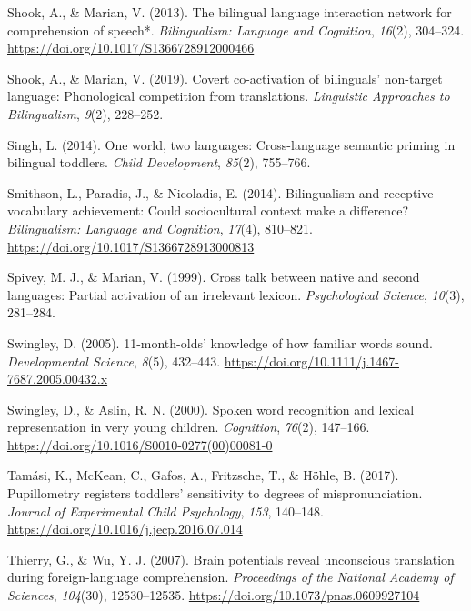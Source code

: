 \documentclass[
]{article}
\newlength{\cslhangindent}
\newlength{\cslentryspacingunit} %
\newenvironment{CSLReferences}[2] %
 {%
  \setlength{\parindent}{0pt}
  \ifodd #1
  \let\oldpar\par
  \def\par{\hangindent=\cslhangindent\oldpar}
  \fi
  \setlength{\parskip}{#2\cslentryspacingunit}
 }%
 {}
\begin{document}
\begin{CSLReferences}{1}{0}
\leavevmode{}%
Shook, A., \& Marian, V. (2013). The bilingual language interaction
network for comprehension of speech*. \emph{Bilingualism: Language and
Cognition}, \emph{16}(2), 304--324.
\url{https://doi.org/10.1017/S1366728912000466}

\leavevmode{}%
Shook, A., \& Marian, V. (2019). Covert co-activation of bilinguals'
non-target language: Phonological competition from translations.
\emph{Linguistic Approaches to Bilingualism}, \emph{9}(2), 228--252.

\leavevmode{}%
Singh, L. (2014). One world, two languages: Cross-language semantic
priming in bilingual toddlers. \emph{Child Development}, \emph{85}(2),
755--766.

\leavevmode{}%
Smithson, L., Paradis, J., \& Nicoladis, E. (2014). Bilingualism and
receptive vocabulary achievement: Could sociocultural context make a
difference? \emph{Bilingualism: Language and Cognition}, \emph{17}(4),
810--821. \url{https://doi.org/10.1017/S1366728913000813}

\leavevmode{}%
Spivey, M. J., \& Marian, V. (1999). Cross talk between native and
second languages: Partial activation of an irrelevant lexicon.
\emph{Psychological Science}, \emph{10}(3), 281--284.

\leavevmode{}%
Swingley, D. (2005). 11-month-olds' knowledge of how familiar words
sound. \emph{Developmental Science}, \emph{8}(5), 432--443.
\url{https://doi.org/10.1111/j.1467-7687.2005.00432.x}

\leavevmode{}%
Swingley, D., \& Aslin, R. N. (2000). Spoken word recognition and
lexical representation in very young children. \emph{Cognition},
\emph{76}(2), 147--166.
\url{https://doi.org/10.1016/S0010-0277(00)00081-0}

\leavevmode{}%
Tamási, K., McKean, C., Gafos, A., Fritzsche, T., \& Höhle, B. (2017).
Pupillometry registers toddlers' sensitivity to degrees of
mispronunciation. \emph{Journal of Experimental Child Psychology},
\emph{153}, 140--148. \url{https://doi.org/10.1016/j.jecp.2016.07.014}

\leavevmode{}%
Thierry, G., \& Wu, Y. J. (2007). Brain potentials reveal unconscious
translation during foreign-language comprehension. \emph{Proceedings of
the National Academy of Sciences}, \emph{104}(30), 12530--12535.
\url{https://doi.org/10.1073/pnas.0609927104}


\end{CSLReferences}
\end{document}
